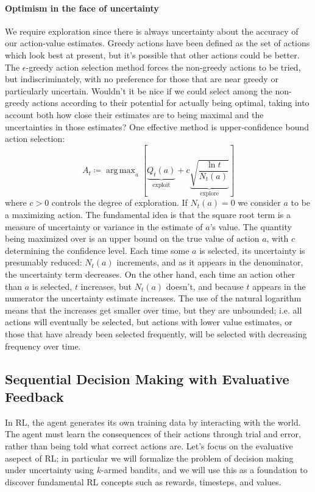 \documentclass[12pt]{article}
\DeclareMathOperator*{\argmax}{arg\,max}
\begin{document}
\paragraph{Optimism in the face of uncertainty}
We require exploration since there is always uncertainty about the accuracy of our action-value estimates. Greedy actions have been defined as the set of actions which look best at present, but it's possible that other actions could be better. The $\epsilon$-greedy action selection method forces the non-greedy actions to be tried, but indiscriminately, with no preference for those that are near greedy or particularly uncertain. Wouldn't it be nice if we could select among the non-greedy actions according to their potential for actually being optimal, taking into account both how close their estimates are to being maximal and the uncertainties in those estimates? One effective method is upper-confidence bound action selection:
\[
  A_t \coloneqq \argmax_a \left[ \underbrace{Q_t(a)}_{\textrm{exploit}} + c \underbrace{\sqrt{\frac{\ln t}{N_t(a)}}}_{\textrm{explore}}\right]
  \]
  where $c>0$ controls the degree of exploration. If $N_t(a) = 0$ we consider $a$ to be a maximizing action. The fundamental idea is that the square root term is a measure of uncertainty or variance in the estimate of $a$'s value. The quantity being maximized over is an upper bound on the true value of action $a$, with $c$ determining the confidence level. Each time some $a$ is selected, its uncertainty is presumably reduced: $N_t(a)$ increments, and as it appears in the denominator, the uncertainty term decreases. On the other hand, each time an action other than $a$ is selected, $t$ increases, but $N_t(a)$ doesn't, and because $t$ appears in the numerator the uncertainty estimate increases. The use of the natural logarithm means that the increases get smaller over time, but they are unbounded; i.e. all actions will eventually be selected, but actions with lower value estimates, or those that have already been selected frequently, will be selected with decreasing frequency over time.

\subsection{Sequential Decision Making with Evaluative Feedback} In RL, the agent generates its own training data by interacting with the world. The agent must learn the consequences of their actions through trial and error, rather than being told what correct actions are. Let's focus on the evaluative asepect of RL; in particular we will formalize the problem of decision making under uncertainty using $k$-armed bandits, and we will use this as a foundation to discover fundamental RL concepts such as rewards, timesteps, and values.
\end{document}
